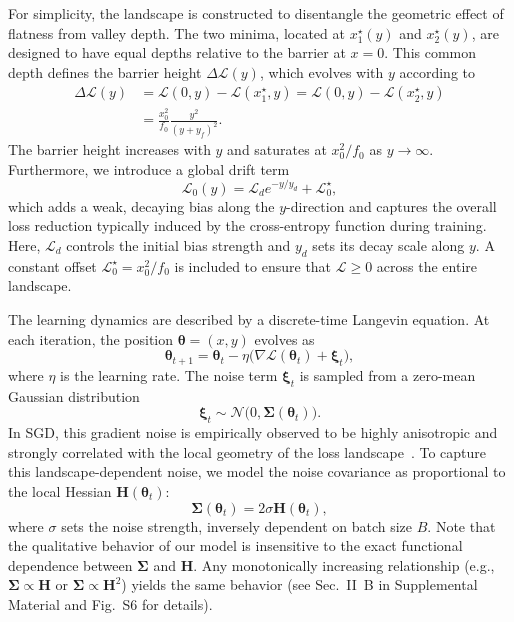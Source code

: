 \documentclass[aps,prx,reprint,superscriptaddress,longbibliography,nofootinbib,floatfix]{revtex4-2}
\begin{document}
For simplicity, the landscape is constructed to disentangle the geometric effect of flatness from valley depth. The two minima, located at $x^{\star}_1(y)$ and $x^{\star}_2(y)$, are designed to have equal depths relative to the barrier at $x=0$. This common depth defines the barrier height $\Delta \mathcal{L}(y)$, which evolves with $y$ according to
\begin{equation}
\begin{split}
    \Delta \mathcal{L}(y) 
    &= \mathcal{L}(0, y) - \mathcal{L}(x_1^{\star}, y) 
     = \mathcal{L}(0, y) - \mathcal{L}(x_2^{\star}, y)  \\
    &= \frac{x_0^2}{f_0} \frac{y^2}{(y+y_f)^2}.
\end{split}
\end{equation}
The barrier height increases with $y$ and saturates at $x_0^2/f_0$ as $y \to \infty$. Furthermore, we introduce a global drift term
\begin{equation}
    \mathcal{L}_0(y) = \mathcal{L}_d e^{-y / y_d} + \mathcal{L}_0^{\star},
\end{equation}
which adds a weak, decaying bias along the $y$-direction and captures the overall loss reduction typically induced by the cross-entropy function during training. Here, $\mathcal{L}_d$ controls the initial bias strength and $y_d$ sets its decay scale along $y$. A constant offset $\mathcal{L}_0^{\star} = x_0^2 / f_0$ is included to ensure that $\mathcal{L} \ge 0$ across the entire landscape.

The learning dynamics are described by a discrete-time Langevin equation. At each iteration, the position $\bm{\theta}=(x,y)$ evolves as
\begin{equation}
    \bm{\theta}_{t+1} = \bm{\theta}_t - \eta \bigl( \nabla \mathcal{L}(\bm{\theta}_t) + \bm{\xi}_t \bigr),
\label{eq:SGD_updating_rule}
\end{equation}
where $\eta$ is the learning rate. The noise term $\bm{\xi}_t$ is sampled from a zero-mean Gaussian distribution
\begin{equation}
    \bm{\xi}_t \sim \mathcal{N}\bigl(0, \mathbf{\Sigma}(\bm{\theta}_t)\bigr).
\end{equation}
In SGD, this gradient noise is empirically observed to be highly anisotropic and strongly correlated with the local geometry of the loss landscape~\cite{fengInverseVarianceFlatness2021,zhuAnisotropicNoiseStochastic2019,xieDiffusionTheoryDeep2021,liHessianBasedAnalysis2020,yangStochasticGradientDescent2023}. To capture this landscape-dependent noise, we model the noise covariance as proportional to the local Hessian $\mathbf{H}(\bm{\theta}_t)$:
\begin{equation}
    \mathbf{\Sigma}(\bm{\theta}_t) = 2\sigma \mathbf{H}(\bm{\theta}_t),
\end{equation}
where $\sigma$ sets the noise strength, inversely dependent on batch size $B$. Note that the qualitative behavior of our model is insensitive to the exact functional dependence between $\mathbf{\Sigma}$ and $\mathbf{H}$. Any monotonically increasing relationship (e.g., $\mathbf{\Sigma}\propto \mathbf{H}$ or $\mathbf{\Sigma}\propto \mathbf{H}^2$) yields the same behavior (see Sec.~II~B in Supplemental Material and Fig.~S6 for details).
\end{document}
